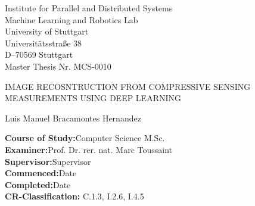 \begin{titlepage}

\centering
\sffamily
%
\small
Institute for Parallel and Distributed Systems \\
Machine Learning and Robotics Lab\\
\null\vspace{0.5cm}
University of Stuttgart\\
Universitätsstraße 38\\
D–70569 Stuttgart\\

\null\vspace{0.9cm}
Master Thesis Nr. MCS-0010

\large
\null\vspace{0.8cm}
{\huge IMAGE RECOSNTRUCTION FROM COMPRESSIVE SENSING MEASUREMENTS USING DEEP LEARNING\\[12pt] 
} 
\null\vspace{0.1cm}

\small
Luis Manuel Bracamontes Hernandez

\raggedright
\null\vspace{0.7cm}
\textbf{Course of Study:}\null\hspace{0.1cm}Computer Science M.Sc.\\
\null\vspace{0.5cm}
\textbf{Examiner:}\null\hspace{0.1cm}Prof. Dr. rer. nat. Marc Toussaint\\
\null\vspace{0.01cm}
\textbf{Supervisor:}\null\hspace{0.1cm}Supervisor\\
\null\vspace{0.5cm}
\textbf{Commenced:}\null\hspace{0.1cm}Date\\
\null\vspace{0.01cm}
\textbf{Completed:}\null\hspace{0.1cm}Date\\
\null\vspace{0.5cm}
\textbf{CR-Classification:}\null\hspace{0.1cm} C.1.3, I.2.6, I.4.5 \\


\vspace{0.5cm}
\end{titlepage}



